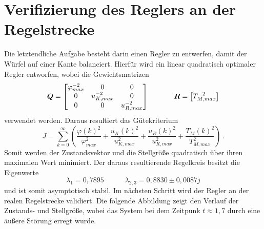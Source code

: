 \section{Verifizierung des Reglers an der Regelstrecke}
Die letztendliche Aufgabe besteht darin einen Regler zu entwerfen, damit der Würfel auf einer Kante balanciert. Hierfür wird ein linear quadratisch optimaler Regler entworfen, wobei die Gewichtsmatrizen
\begin{equation}
\boldsymbol{Q} = \begin{bmatrix}
\varphi^{-2}_{max} & 0 & 0 \\
0 & u^{-2}_{K,max} & 0 \\
0 & 0 & u^{-2}_{R,max}
\end{bmatrix}
\hspace{35pt}
\boldsymbol{R} = \begin{bmatrix} T^{-2}_{M,max} \end{bmatrix}
\end{equation}
verwendet werden. Daraus resultiert das Gütekriterium
\begin{equation}
J = \sum^{\infty}_{k=0}\left( \frac{\varphi(k)^2}{\varphi^2_{max}} + \frac{u_K(k)^2}{u^2_{K,max}} + \frac{u_{R}(k)^2}{u^2_{R,max}} + \frac{T_M(k)^2}{T^2_{M,max}}\right)\,.
\end{equation}
Somit werden der Zustandsvektor und die Stellgröße quadratisch über ihren maximalen Wert minimiert. Der daraus resultierende Regelkreis besitzt die Eigenwerte
\begin{equation}
\lambda_1 = 0{,}7895 \hspace{35pt} \lambda_{2,3} = 0{,}8830 \pm 0{,}0087j
\end{equation}
und ist somit asymptotisch stabil. Im nächsten Schritt wird der Regler an der realen Regelstrecke validiert. Die folgende Abbildung zeigt den Verlauf der Zustands- und Stellgröße, wobei das System bei dem Zeitpunk $t\approx 1{,}7$ durch eine äußere Störung erregt wurde.
